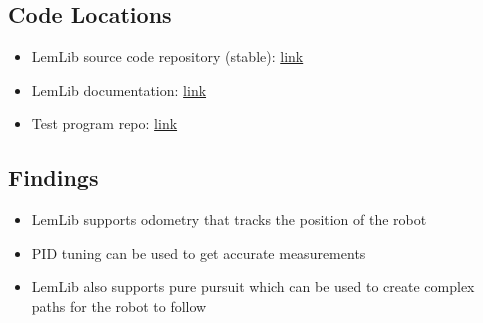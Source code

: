 \subsection{Code Locations}
\begin{itemize}
    \item LemLib source code repository (stable): \href{https://github.com/LemLib/LemLib/tree/stable/}{link}
    \item LemLib documentation: \href{https://lemlib.readthedocs.io/en/stable/}{link}
    \item Test program repo: \href{https://github.com/msoe-vex/CasADi-Test.git}{link}
\end{itemize}

\subsection{Findings}
\begin{itemize}
    \item LemLib supports odometry that tracks the position of the robot
    \item PID tuning can be used to get accurate measurements
    \item LemLib also supports pure pursuit which can be used to create complex paths for the robot to follow
\end{itemize}


